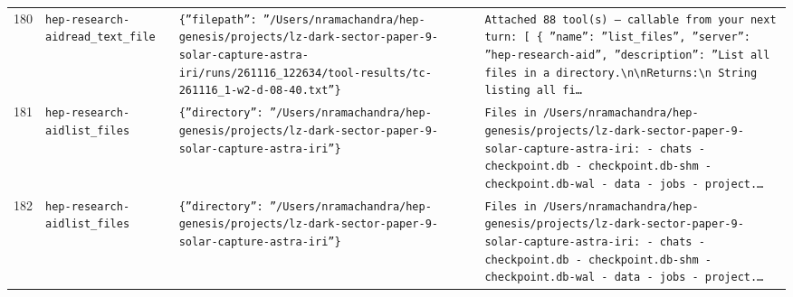 \documentclass[11pt,a4paper]{article}
\begin{document}
\begin{longtable}{@{}p{}p{}p{}p{}@{}}
180 & \texttt{hep-research-aid}\newline\texttt{read\_\allowbreak{}text\_\allowbreak{}file} & \texttt{\{''filepath'':\allowbreak{} ''/\allowbreak{}Users/\allowbreak{}nramachandra/\allowbreak{}hep-genesis/\allowbreak{}projects/\allowbreak{}lz-dark-sector-paper-9-solar-capture-astra-iri/\allowbreak{}runs/\allowbreak{}261116\_\allowbreak{}122634/\allowbreak{}tool-results/\allowbreak{}tc-261116\_\allowbreak{}1-w2-d-08-40.txt''\}\allowbreak{}} & \texttt{Attached 88 tool(s)\allowbreak{} --- callable from your next turn:\allowbreak{} [  \{   ''name'':\allowbreak{} ''list\_\allowbreak{}files'',\allowbreak{}   ''server'':\allowbreak{} ''hep-research-aid'',\allowbreak{}   ''description'':\allowbreak{} ''List all files in a directory.\textbackslash{}\allowbreak{}n\textbackslash{}\allowbreak{}nReturns:\allowbreak{}\textbackslash{}\allowbreak{}n    String listing all fi\ldots{}\allowbreak{}} \\
181 & \texttt{hep-research-aid}\newline\texttt{list\_\allowbreak{}files} & \texttt{\{''directory'':\allowbreak{} ''/\allowbreak{}Users/\allowbreak{}nramachandra/\allowbreak{}hep-genesis/\allowbreak{}projects/\allowbreak{}lz-dark-sector-paper-9-solar-capture-astra-iri''\}\allowbreak{}} & \texttt{Files in /\allowbreak{}Users/\allowbreak{}nramachandra/\allowbreak{}hep-genesis/\allowbreak{}projects/\allowbreak{}lz-dark-sector-paper-9-solar-capture-astra-iri:\allowbreak{}   - chats   - checkpoint.db   - checkpoint.db-shm   - checkpoint.db-wal   - data   - jobs   - project.\ldots{}\allowbreak{}} \\
182 & \texttt{hep-research-aid}\newline\texttt{list\_\allowbreak{}files} & \texttt{\{''directory'':\allowbreak{} ''/\allowbreak{}Users/\allowbreak{}nramachandra/\allowbreak{}hep-genesis/\allowbreak{}projects/\allowbreak{}lz-dark-sector-paper-9-solar-capture-astra-iri''\}\allowbreak{}} & \texttt{Files in /\allowbreak{}Users/\allowbreak{}nramachandra/\allowbreak{}hep-genesis/\allowbreak{}projects/\allowbreak{}lz-dark-sector-paper-9-solar-capture-astra-iri:\allowbreak{}   - chats   - checkpoint.db   - checkpoint.db-shm   - checkpoint.db-wal   - data   - jobs   - project.\ldots{}\allowbreak{}} \\

\end{longtable}
\end{document}
